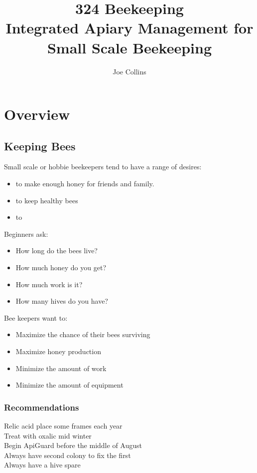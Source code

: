 \documentclass{./BeekeepingBook}
\title{\Huge 324 Beekeeping\\ \vspace{1 ex} \Large Integrated Apiary Management for Small Scale Beekeeping}
\author{Joe Collins}
\date{\DTMnow}
\begin{document}
 
\maketitle
\tableofcontents

\chapter{Overview}

\section*{Keeping Bees}

Small scale or hobbie beekeepers tend to have a range of desires:

\begin{itemize}
  \item to make enough honey for friends and family.
  \item to keep healthy bees
  \item to 
\end{itemize}

Beginners ask:

\begin{itemize}
  \item How long do the bees live?
  \item How much honey do you get?
  \item How much work is it?
  \item How many hives do you have?
\end{itemize}

Bee keepers want to:

\begin{itemize}
  \item Maximize the chance of their bees surviving
  \item Maximize honey production
  \item Minimize the amount of work
  \item Minimize the amount of equipment
\end{itemize}

\subsection*{Recommendations}

\begin{description}
  \item[Relic acid place some frames each year]
  \item[Treat with oxalic mid winter]
  \item[Begin ApiGuard before the middle of August]
  \item[Always have second colony to fix the first]
  \item[Always have a hive spare]
\end{description}
\end{document}

